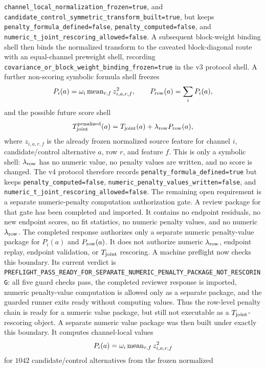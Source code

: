 \texttt{channel\_local\_normalization\_frozen=true}, and
\texttt{candidate\_control\_symmetric\_transform\_built=true}, but keeps
\texttt{penalty\_formula\_defined=false},
\texttt{penalty\_computed=false}, and
\texttt{numeric\_t\_joint\_rescoring\_allowed=false}.  A subsequent
block-weight binding shell then binds the normalized transform to the caveated
block-diagonal route with an equal-channel preweight shell, recording
\texttt{covariance\_or\_block\_weight\_binding\_frozen=true} in the v3
protocol shell.  A further non-scoring symbolic formula shell freezes
\[
  P_i(a)=\omega_i\,{\rm mean}_{r,f}\,z_{i,a,r,f}^2,\qquad
  P_{\rm row}(a)=\sum_i P_i(a),
\]
and the possible future score shell
\[
  T_{\rm joint}^{\rm penalized}(a)
  =
  T_{\rm joint}(a)+\lambda_{\rm row}P_{\rm row}(a),
\]
where \(z_{i,a,r,f}\) is the already frozen normalized source feature for
channel \(i\), candidate/control alternative \(a\), row \(r\), and feature
\(f\).  This is only a symbolic shell: \(\lambda_{\rm row}\) has no numeric
value, no penalty values are written, and no score is changed.  The v4 protocol
therefore records \texttt{penalty\_formula\_defined=true} but keeps
\texttt{penalty\_computed=false},
\texttt{numeric\_penalty\_values\_written=false}, and
\texttt{numeric\_t\_joint\_rescoring\_allowed=false}.  The remaining open
requirement is a separate numeric-penalty computation authorization gate.  A
review package for that gate has been completed and imported.  It contains no
endpoint residuals, no new endpoint scores, no fit statistics, no numeric
penalty values, and no numeric \(\lambda_{\rm row}\).  The completed response
authorizes only a separate numeric penalty-value package for \(P_i(a)\) and
\(P_{\rm row}(a)\).  It does not authorize numeric \(\lambda_{\rm row}\),
endpoint replay, endpoint validation, or \(T_{\rm joint}\) rescoring.  A machine
preflight now checks this boundary.  Its current verdict is
\texttt{PREFLIGHT\_PASS\_READY\_FOR\_SEPARATE\_NUMERIC\_PENALTY\_PACKAGE\_NOT\_RESCORING}:
all five guard checks pass, the completed reviewer response is imported,
numeric penalty-value computation is allowed only as a separate package, and
the guarded runner exits ready without computing values.  Thus the row-level
penalty chain is ready for a numeric value package, but still not executable as
a \(T_{\rm joint}\)-rescoring object.
A separate numeric value package was then built under exactly this boundary.
It computes channel-local values
\[
  P_i(a)=\omega_i\,{\rm mean}_{r,f}\,z_{i,a,r,f}^2
\]
for \(1042\) candidate/control alternatives from the frozen normalized
